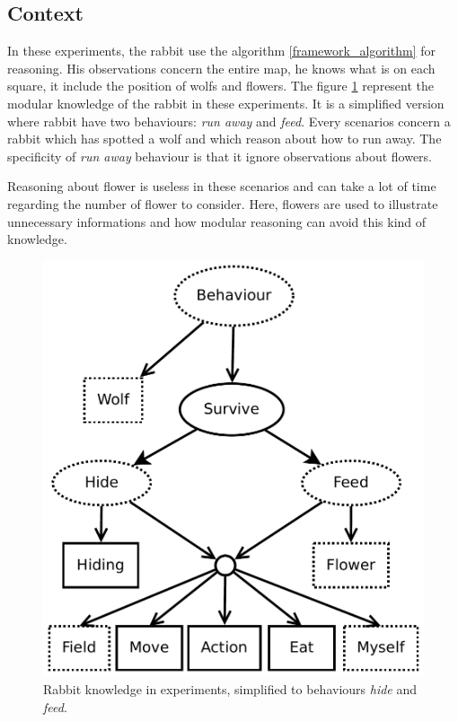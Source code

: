 \documentclass{aamas2012}
\begin{document}
\subsection{Context}
	
	In these experiments, the rabbit use the algorithm \ref{framework_algorithm} for reasoning.
	His observations concern the entire map, he knows what is on each square, it include the position of wolfs and flowers.
	The figure \ref{modular_knowledge_experiment} represent the modular knowledge of the rabbit in these experiments.
	It is a simplified version where rabbit have two behaviours: \textit{run away} and \textit{feed}.
	Every scenarios concern a rabbit which has spotted a wolf and which reason about how to run away.
	The specificity of \textit{run away} behaviour is that it ignore observations about flowers. 
	
	Reasoning about flower is useless in these scenarios and can take a lot of time regarding the number of flower to consider.
	Here, flowers are used to illustrate unnecessary informations and how modular reasoning can avoid this kind of knowledge.
	
	\begin{figure}
		\centering
		\includegraphics[keepaspectratio=true, scale=0.4]{modular_knowledge_experiment.pdf}
		\caption
		{
			\label{modular_knowledge_experiment}
			Rabbit knowledge in experiments, simplified to behaviours \emph{hide} and \emph{feed}.
		}
	\end{figure}
	
\end{document}
